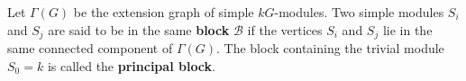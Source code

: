 Let $\Gamma(G)$ be the extension graph of simple $kG$-modules. Two simple modules $S_i$ and $S_j$ are said to be in the same \textbf{block} $\mathcal{B}$ if the vertices $S_i$ and $S_j$ lie in the same connected component of $\Gamma(G)$. The block containing the trivial module $S_0 = k$ is called the \textbf{principal block}.
